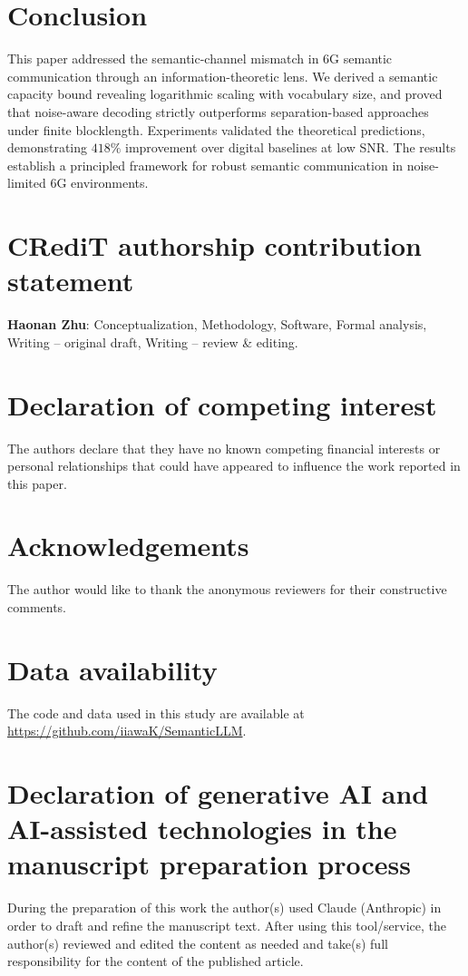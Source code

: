 \documentclass[a4paper,fleqn]{cas-sc}
\begin{document}
\section{Conclusion}\label{sec:conclusion}

This paper addressed the semantic-channel mismatch in 6G semantic communication through an information-theoretic lens. We derived a semantic capacity bound revealing logarithmic scaling with vocabulary size, and proved that noise-aware decoding strictly outperforms separation-based approaches under finite blocklength. Experiments validated the theoretical predictions, demonstrating $418\%$ improvement over digital baselines at low SNR. The results establish a principled framework for robust semantic communication in noise-limited 6G environments.



\section*{CRediT authorship contribution statement}
\textbf{Haonan Zhu}: Conceptualization, Methodology, Software, Formal analysis, Writing -- original draft, Writing -- review \& editing.

\section*{Declaration of competing interest}
The authors declare that they have no known competing financial interests or personal relationships that could have appeared to influence the work reported in this paper.

\section*{Acknowledgements}
The author would like to thank the anonymous reviewers for their constructive comments.

\section*{Data availability}
The code and data used in this study are available at \url{https://github.com/iiawaK/SemanticLLM}.

\section*{Declaration of generative AI and AI-assisted technologies in the manuscript preparation process}
During the preparation of this work the author(s) used Claude (Anthropic) in order to draft and refine the manuscript text. After using this tool/service, the author(s) reviewed and edited the content as needed and take(s) full responsibility for the content of the published article.




\end{document}
